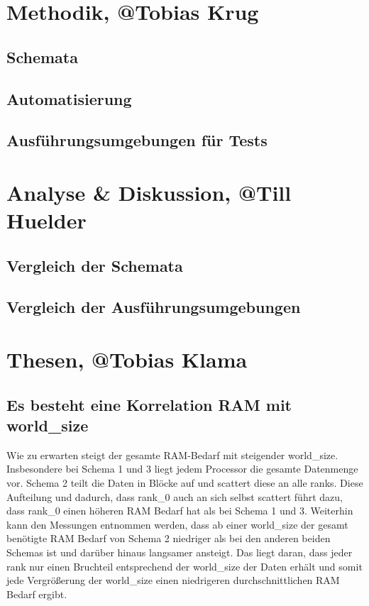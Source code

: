 \section{Methodik, @Tobias Krug}
\subsection{Schemata}
\subsection{Automatisierung}
\subsection{Ausführungsumgebungen für Tests}

\section{Analyse \& Diskussion, @Till Huelder}
\subsection{Vergleich der Schemata}
\subsection{Vergleich der Ausführungsumgebungen}

\section{Thesen, @Tobias Klama}
\subsection{Es besteht eine Korrelation RAM mit world\_size}

Wie zu erwarten steigt der gesamte RAM-Bedarf mit steigender world\_size. Insbesondere bei Schema 1 und 3 liegt jedem Processor
die gesamte Datenmenge vor.
Schema 2 teilt die Daten in Blöcke auf und scattert diese an alle ranks. Diese Aufteilung und dadurch, dass rank\_0 auch an sich selbst
scattert führt dazu, dass rank\_0 einen höheren RAM Bedarf hat als bei Schema 1 und 3. Weiterhin kann den Messungen entnommen werden,
dass ab einer world\_size der gesamt benötigte RAM Bedarf von Schema 2 niedriger als bei den anderen beiden Schemas ist und darüber
hinaus langsamer ansteigt.
Das liegt daran, dass jeder rank nur einen Bruchteil entsprechend der world\_size der Daten erhält und somit jede Vergrößerung der
world\_size einen niedrigeren durchschnittlichen RAM Bedarf ergibt.

